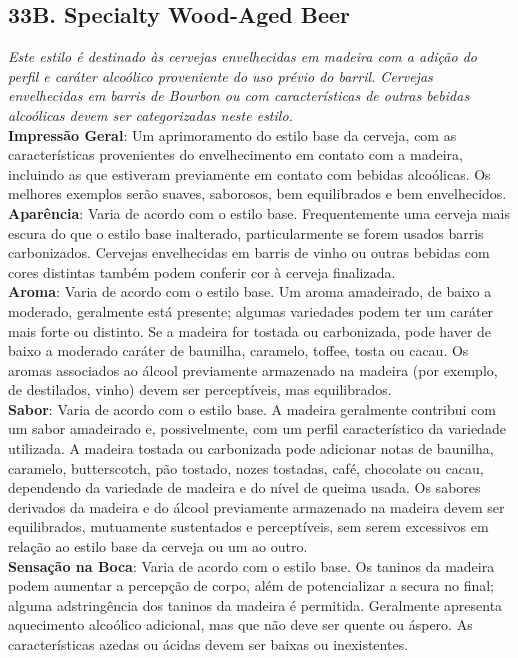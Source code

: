 \subsection*{33B. Specialty Wood-Aged Beer}
\textit{Este estilo é destinado às cervejas envelhecidas em madeira com a adição do perfil e caráter alcoólico proveniente do uso prévio do barril. Cervejas envelhecidas em barris de Bourbon ou com características de outras bebidas alcoólicas devem ser categorizadas neste estilo.}\\
\textbf{Impressão Geral}: Um aprimoramento do estilo base da cerveja, com as características provenientes do envelhecimento em contato com a madeira, incluindo as que estiveram previamente em contato com bebidas alcoólicas. Os melhores exemplos serão suaves, saborosos, bem equilibrados e bem envelhecidos. \\
\textbf{Aparência}: Varia de acordo com o estilo base. Frequentemente uma cerveja mais escura do que o estilo base inalterado, particularmente se forem usados barris carbonizados. Cervejas envelhecidas em barris de vinho ou outras bebidas com cores distintas também podem conferir cor à cerveja finalizada. \\
\textbf{Aroma}: Varia de acordo com o estilo base. Um aroma amadeirado, de baixo a moderado, geralmente está presente; algumas variedades podem ter um caráter mais forte ou distinto. Se a madeira for tostada ou carbonizada, pode haver de baixo a moderado caráter de baunilha, caramelo, toffee, tosta ou cacau. Os aromas associados ao álcool previamente armazenado na madeira (por exemplo, de destilados, vinho) devem ser perceptíveis, mas equilibrados. \\
\textbf{Sabor}: Varia de acordo com o estilo base. A madeira geralmente contribui com um sabor amadeirado e, possivelmente, com um perfil característico da variedade utilizada. A madeira tostada ou carbonizada pode adicionar notas de baunilha, caramelo, butterscotch, pão tostado, nozes tostadas, café, chocolate ou cacau, dependendo da variedade de madeira e do nível de queima usada. Os sabores derivados da madeira e do álcool previamente armazenado na madeira devem ser equilibrados, mutuamente sustentados e perceptíveis, sem serem excessivos em relação ao estilo base da cerveja ou um ao outro. \\
\textbf{Sensação na Boca}: Varia de acordo com o estilo base. Os taninos da madeira podem aumentar a percepção de corpo, além de potencializar a secura no final; alguma adstringência dos taninos da madeira é permitida. Geralmente apresenta aquecimento alcoólico adicional, mas que não deve ser quente ou áspero. As características azedas ou ácidas devem ser baixas ou inexistentes. \\
